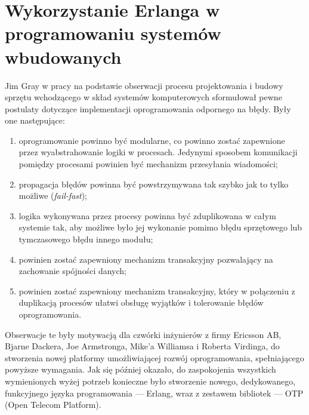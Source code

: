 
\section{Wykorzystanie Erlanga w programowaniu systemów wbudowanych}
\label{sec:jezykiFunkcyjne}

Jim Gray w pracy \cite{Gray85whydo} na podstawie obserwacji procesu projektowania i budowy sprzętu wchodzącego w skład systemów komputerowych sformułował pewne postulaty dotyczące implementacji oprogramowania odpornego na błędy.
Były one następujące:
\begin{enumerate}
\item oprogramowanie powinno być modularne, co powinno zostać zapewnione przez wyabstrahowanie logiki w procesach. Jedynymi sposobem komunikacji pomiędzy procesami powinien być mechanizm przesyłania wiadomości;
\item propagacja błędów powinna być powstrzymywana tak szybko jak to tylko możliwe (\emph{fail-fast});
\item logika wykonywana przez procesy powinna być zduplikowana w całym systemie tak, aby możliwe było jej wykonanie pomimo błędu sprzętowego lub tymczasowego błędu innego modułu;
\item powinien zostać zapewniony mechanizm transakcyjny pozwalający na zachowanie spójności danych;
\item powinien zostać zapewniony mechanizm transakcyjny, który w połączeniu z duplikacją procesów ułatwi obsługę wyjątków i tolerowanie błędów oprogramowania.
\end{enumerate}

Obserwacje te były motywacją dla czwórki inżynierów z firmy Ericsson AB, Bjarne Dackera, Joe Armstronga, Mike'a Williamsa i Roberta Virdinga, do stworzenia nowej platformy umożliwiającej rozwój oprogramowania, spełniającego powyższe wymagania.
Jak się później okazało, do zaspokojenia wszystkich wymienionych wyżej potrzeb konieczne było stworzenie nowego, dedykowanego, funkcyjnego języka programowania --- Erlang, wraz z zestawem bibliotek --- OTP (Open Telecom Platform).


